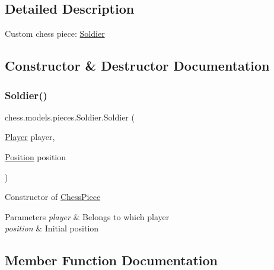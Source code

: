 \subsection{Detailed Description}
Custom chess piece\+: \mbox{\hyperlink{classchess_1_1models_1_1pieces_1_1_soldier}{Soldier}} 

\subsection{Constructor \& Destructor Documentation}
\mbox{\label{classchess_1_1models_1_1pieces_1_1_soldier_a3de8743b5a054a97b126297e3e5fea36}} 
\subsubsection{\texorpdfstring{Soldier()}{Soldier()}}
{\footnotesize\ttfamily chess.\+models.\+pieces.\+Soldier.\+Soldier (\begin{DoxyParamCaption}\item[{\mbox{\hyperlink{enumchess_1_1models_1_1enums_1_1_player}{Player}}}]{player,  }\item[{\mbox{\hyperlink{classchess_1_1models_1_1_position}{Position}}}]{position }\end{DoxyParamCaption})}

Constructor of \mbox{\hyperlink{classchess_1_1models_1_1_chess_piece}{Chess\+Piece}}


\begin{DoxyParams}{Parameters}
{\em player} & Belongs to which player \\
\hline
{\em position} & Initial position \\
\hline
\end{DoxyParams}


\subsection{Member Function Documentation}
\mbox{\label{classchess_1_1models_1_1pieces_1_1_soldier_a9ee2ecb79068bd41f01608f23cd8dd01}} 
